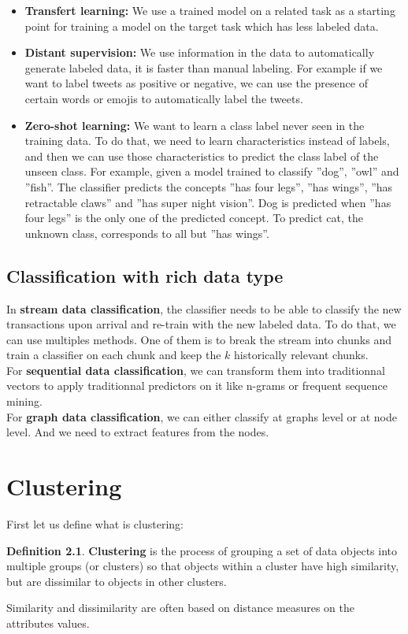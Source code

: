 \documentclass[12pt, openany]{report}
\theoremstyle{definition}
\newtheorem{definition}[thm]{Definition}
\begin{document}
\begin{itemize}
    \item \textbf{Transfert learning:} We use a trained model on a related task as a starting point for training a model on the target task which has less labeled data. 
    \item \textbf{Distant supervision:} We use information in the data to automatically generate labeled data, it is faster than manual labeling. For example if we want to label tweets as positive or negative, we can use the presence of certain words or emojis to automatically label the tweets.  
    \item \textbf{Zero-shot learning:} We want to learn a class label never seen in the training data. To do that, we need to learn characteristics instead of labels, and then we can use those characteristics to predict the class label of the unseen class. For example, given a model trained to classify ”dog”, ”owl” and ”fish”. The classifier predicts the concepts ”has four legs”, ”has wings”, ”has retractable claws” and ”has super night vision”. Dog is predicted when ”has four legs” is the only one of the predicted concept. To predict cat, the unknown class, corresponds to all but ”has wings”.
\end{itemize}
\section{Classification with rich data type}
In \textbf{stream data classification}, the classifier needs to be able to classify the new transactions upon arrival and re-train with the new labeled data. To do that, we can use multiples methods. One of them is to break the stream into chunks and train a classifier on each chunk and keep the $k$ historically relevant chunks.\\
For \textbf{sequential data classification}, we can transform them into traditionnal vectors to apply traditionnal predictors on it like n-grams or frequent sequence mining.\\
For \textbf{graph data classification}, we can either classify at graphs level or at node level. And we need to extract features from the nodes.
\chapter{Clustering}
First let us define what is clustering:
\begin{definition}
    \textbf{Clustering} is the process of grouping a set of data objects into multiple groups (or clusters) so that objects within a cluster have high similarity, but are dissimilar to objects in other clusters.
\end{definition}
Similarity and dissimilarity are often based on distance measures on the attributes values.
\end{document}
